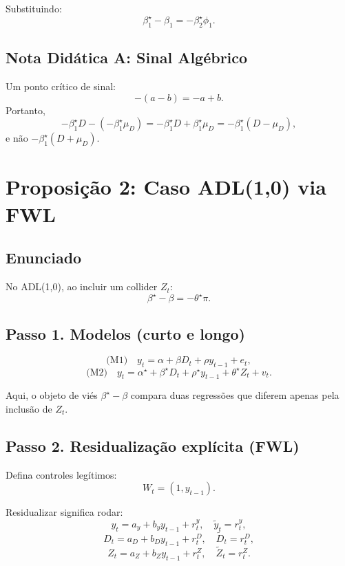 \documentclass[
]{article}
\begin{document}
Substituindo: \[
\boxed{\beta_1^\star-\beta_1=-\beta_2^\star\phi_1.}
\]

\subsection{Nota Didática A: Sinal
Algébrico}\label{nota-diduxe1tica-a-sinal-alguxe9brico}

Um ponto crítico de sinal: \[
-(a-b)=-a+b.
\] Portanto, \[
-\beta_1^\star D -(-\beta_1^\star\mu_D)
=
-\beta_1^\star D+\beta_1^\star\mu_D
=
-\beta_1^\star(D-\mu_D),
\] e não \(-\beta_1^\star(D+\mu_D)\).

\section{Proposição 2: Caso ADL(1,0) via
FWL}\label{proposiuxe7uxe3o-2-caso-adl10-via-fwl}

\subsection{Enunciado}\label{enunciado-1}

No ADL(1,0), ao incluir um collider \(Z_t\): \[
\beta^\star-\beta=-\theta^\star\pi.
\]

\subsection{Passo 1. Modelos (curto e
longo)}\label{passo-1.-modelos-curto-e-longo}

\[
\text{(M1)}\quad y_t=\alpha+\beta D_t+\rho y_{t-1}+e_t,
\] \[
\text{(M2)}\quad y_t=\alpha^\star+\beta^\star D_t+\rho^\star y_{t-1}+\theta^\star Z_t+v_t.
\]

Aqui, o objeto de viés \(\beta^\star-\beta\) compara duas regressões que
diferem apenas pela inclusão de \(Z_t\).

\subsection{Passo 2. Residualização explícita
(FWL)}\label{passo-2.-residualizauxe7uxe3o-expluxedcita-fwl}

Defina controles legítimos: \[
W_t=(1,y_{t-1}).
\]

Residualizar significa rodar: \[
y_t = a_y + b_y y_{t-1} + r^y_t,\quad \widetilde{y}_t=r^y_t,
\] \[
D_t = a_D + b_D y_{t-1} + r^D_t,\quad \widetilde{D}_t=r^D_t,
\] \[
Z_t = a_Z + b_Z y_{t-1} + r^Z_t,\quad \widetilde{Z}_t=r^Z_t.
\]
\end{document}
